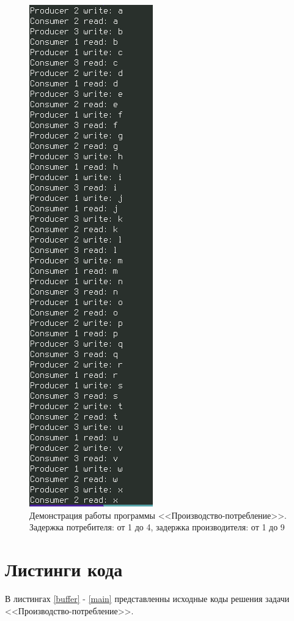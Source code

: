 \documentclass[12pt]{report}
\begin{document}
\begin{figure}[H]
	\centering
	\includegraphics[scale=0.75]{img/prod-cons-03.png}
	\caption{Демонстрация работы программы <<Производство-потребление>>. Задержка потребителя: от 1 до 4, задержка производителя: от 1 до 9}
	\label{fig:task01-03}
\end{figure}

\section{Листинги кода}

В листингах \ref{buffer} - \ref{main} представленны исходные коды решения задачи <<Производство-потребление>>.
\end{document}
